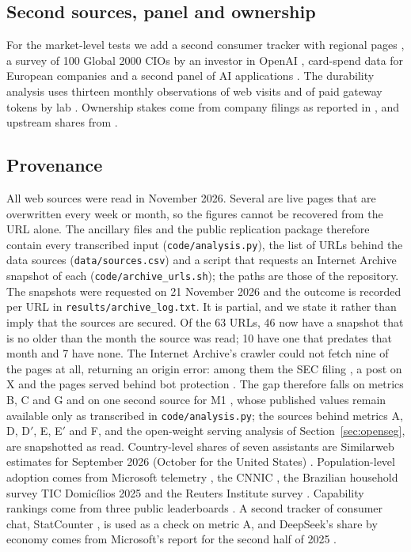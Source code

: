 \documentclass[11pt]{article}
\begin{document}
\subsection{Second sources, panel and ownership} For the market-level tests we add a second consumer tracker with regional pages \cite{statcounter2026}, a survey of 100 Global 2000 CIOs by an investor in OpenAI \cite{a16z2026cio}, card-spend data for European companies \cite{moss2026spend} and a second panel of AI applications \cite{aicpb2026june}. The durability analysis uses thirteen monthly observations of web visits and of paid gateway tokens by lab \cite{aimultiple2026share}. Ownership stakes come from company filings as reported in \cite{microsoft2026q1,cnbc2026openai,fortune2026anthropic,csa2026frontier}, and upstream shares from \cite{synergy2026q3,siliconanalysts2026chain,mordor2026gpu}.

\subsection{Provenance} All web sources were read in November 2026. Several are live pages that are overwritten every week or month, so the figures cannot be recovered from the URL alone. The ancillary files and the public replication package \cite{oliveira2026repo} therefore contain every transcribed input (\texttt{code/analysis.py}), the list of URLs behind the data sources (\texttt{data/sources.csv}) and a script that requests an Internet Archive snapshot of each (\texttt{code/archive\_urls.sh}); the paths are those of the repository. The snapshots were requested on 21 November 2026 and the outcome is recorded per URL in \texttt{results/archive\_log.txt}. It is partial, and we state it rather than imply that the sources are secured. Of the 63 URLs, 46 now have a snapshot that is no older than the month the source was read; 10 have one that predates that month and 7 have none. The Internet Archive's crawler could not fetch nine of the pages at all, returning an origin error: among them the SEC filing \cite{microsoft2026q1}, a post on X \cite{epoch2026thread} and the pages served behind bot protection \cite{counterpoint2026mau,counterpoint2026revenue,questmobile2026q3,csa2026frontier}. The gap therefore falls on metrics B, C and G and on one second source for M1 \cite{statcounter2026}, whose published values remain available only as transcribed in \texttt{code/analysis.py}; the sources behind metrics A, D, D$'$, E, E$'$ and F, and the open-weight serving analysis of Section~\ref{sec:openseg}, are snapshotted as read. Country-level shares of seven assistants are Similarweb estimates for September 2026 (October for the United States) \cite{momentic2026chatbots}. Population-level adoption comes from Microsoft telemetry \cite{microsoft2026q2,misra2025measuring}, the CNNIC \cite{cnnic2026genai}, the Brazilian household survey TIC Domic\'ilios 2025 \cite{cetic2025tic} and the Reuters Institute survey \cite{reuters2026genai}. Capability rankings come from three public leaderboards \cite{benchlm2026,llmleaderboard2026,hf2026collection}. A second tracker of consumer chat, StatCounter \cite{statcounter2026}, is used as a check on metric A, and DeepSeek's share by economy comes from Microsoft's report for the second half of 2025 \cite{microsoft2026h2}.
\end{document}
